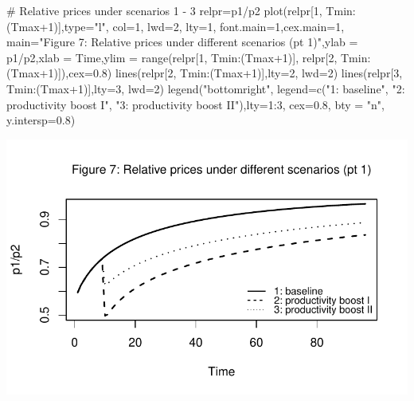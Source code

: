 \documentclass[
  letterpaper,
  DIV=11,
  numbers=noendperiod]{scrreprt}
\newenvironment{Shaded}{\begin{snugshade}}{\end{snugshade}}
\newcommand{\AttributeTok}[1]{\textcolor[rgb]{0.40,0.45,0.13}{#1}}
\newcommand{\CommentTok}[1]{\textcolor[rgb]{0.37,0.37,0.37}{#1}}
\newcommand{\DecValTok}[1]{\textcolor[rgb]{0.68,0.00,0.00}{#1}}
\newcommand{\FloatTok}[1]{\textcolor[rgb]{0.68,0.00,0.00}{#1}}
\newcommand{\FunctionTok}[1]{\textcolor[rgb]{0.28,0.35,0.67}{#1}}
\newcommand{\NormalTok}[1]{\textcolor[rgb]{0.00,0.23,0.31}{#1}}
\newcommand{\OtherTok}[1]{\textcolor[rgb]{0.00,0.23,0.31}{#1}}
\newcommand{\SpecialCharTok}[1]{\textcolor[rgb]{0.37,0.37,0.37}{#1}}
\newcommand{\StringTok}[1]{\textcolor[rgb]{0.13,0.47,0.30}{#1}}
\begin{document}
\begin{Shaded}
\begin{Highlighting}[]
\CommentTok{\# Relative prices under scenarios 1 {-} 3}
\NormalTok{relpr}\OtherTok{=}\NormalTok{p1}\SpecialCharTok{/}\NormalTok{p2}
\FunctionTok{plot}\NormalTok{(relpr[}\DecValTok{1}\NormalTok{, Tmin}\SpecialCharTok{:}\NormalTok{(Tmax}\SpecialCharTok{+}\DecValTok{1}\NormalTok{)],}\AttributeTok{type=}\StringTok{"l"}\NormalTok{, }\AttributeTok{col=}\DecValTok{1}\NormalTok{, }\AttributeTok{lwd=}\DecValTok{2}\NormalTok{, }\AttributeTok{lty=}\DecValTok{1}\NormalTok{, }\AttributeTok{font.main=}\DecValTok{1}\NormalTok{,}\AttributeTok{cex.main=}\DecValTok{1}\NormalTok{, }
     \AttributeTok{main=}\StringTok{"Figure 7: Relative prices under different scenarios (pt 1)"}\NormalTok{,}\AttributeTok{ylab =} \StringTok{\textquotesingle{}p1/p2\textquotesingle{}}\NormalTok{,}\AttributeTok{xlab =} \StringTok{\textquotesingle{}Time\textquotesingle{}}\NormalTok{,}\AttributeTok{ylim =} \FunctionTok{range}\NormalTok{(relpr[}\DecValTok{1}\NormalTok{, Tmin}\SpecialCharTok{:}\NormalTok{(Tmax}\SpecialCharTok{+}\DecValTok{1}\NormalTok{)], relpr[}\DecValTok{2}\NormalTok{, Tmin}\SpecialCharTok{:}\NormalTok{(Tmax}\SpecialCharTok{+}\DecValTok{1}\NormalTok{)]),}\AttributeTok{cex=}\FloatTok{0.8}\NormalTok{)}
\FunctionTok{lines}\NormalTok{(relpr[}\DecValTok{2}\NormalTok{, Tmin}\SpecialCharTok{:}\NormalTok{(Tmax}\SpecialCharTok{+}\DecValTok{1}\NormalTok{)],}\AttributeTok{lty=}\DecValTok{2}\NormalTok{, }\AttributeTok{lwd=}\DecValTok{2}\NormalTok{)}
\FunctionTok{lines}\NormalTok{(relpr[}\DecValTok{3}\NormalTok{, Tmin}\SpecialCharTok{:}\NormalTok{(Tmax}\SpecialCharTok{+}\DecValTok{1}\NormalTok{)],}\AttributeTok{lty=}\DecValTok{3}\NormalTok{, }\AttributeTok{lwd=}\DecValTok{2}\NormalTok{)}
\FunctionTok{legend}\NormalTok{(}\StringTok{"bottomright"}\NormalTok{, }\AttributeTok{legend=}\FunctionTok{c}\NormalTok{(}\StringTok{"1: baseline"}\NormalTok{, }\StringTok{"2: productivity boost I"}\NormalTok{, }\StringTok{"3: productivity boost II"}\NormalTok{),}\AttributeTok{lty=}\DecValTok{1}\SpecialCharTok{:}\DecValTok{3}\NormalTok{, }\AttributeTok{cex=}\FloatTok{0.8}\NormalTok{, }\AttributeTok{bty =} \StringTok{"n"}\NormalTok{, }\AttributeTok{y.intersp=}\FloatTok{0.8}\NormalTok{)}
\end{Highlighting}
\end{Shaded}

\includegraphics{a_ricardian_two_sector_model_files/figure-pdf/ricardo2_4-1.pdf}
\end{document}

